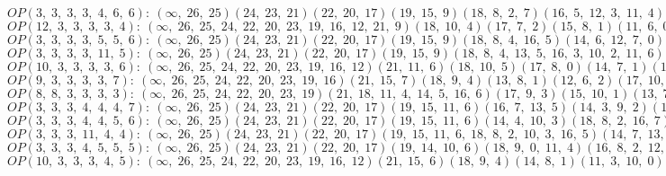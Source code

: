 $OP(3, \;3, \;3, \;3, \;4, \;6, \;6): \:(\infty, \;26, \;25)(24, \;23, \;21)(22, \;20, \;17)(19, \;15, \;9)(18, \;8, \;2, \;7)(16, \;5, \;12, \;3, \;11, \;4)(14, \;6, \;10, \;1, \;13, \;0)$\\
$OP(12, \;3, \;3, \;3, \;3, \;4): \:(\infty, \;26, \;25, \;24, \;22, \;20, \;23, \;19, \;16, \;12, \;21, \;9)(18, \;10, \;4)(17, \;7, \;2)(15, \;8, \;1)(11, \;6, \;0)(14, \;5, \;13, \;3)$\\
$OP(3, \;3, \;3, \;3, \;5, \;5, \;6): \:(\infty, \;26, \;25)(24, \;23, \;21)(22, \;20, \;17)(19, \;15, \;9)(18, \;8, \;4, \;16, \;5)(14, \;6, \;12, \;7, \;0)(13, \;2, \;11, \;3, \;10, \;1)$\\
$OP(3, \;3, \;3, \;3, \;11, \;5): \:(\infty, \;26, \;25)(24, \;23, \;21)(22, \;20, \;17)(19, \;15, \;9)(18, \;8, \;4, \;13, \;5, \;16, \;3, \;10, \;2, \;11, \;6)(14, \;7, \;1, \;12, \;0)$\\
$OP(10, \;3, \;3, \;3, \;3, \;6): \:(\infty, \;26, \;25, \;24, \;22, \;20, \;23, \;19, \;16, \;12)(21, \;11, \;6)(18, \;10, \;5)(17, \;8, \;0)(14, \;7, \;1)(15, \;4, \;13, \;2, \;9, \;3)$\\
$OP(9, \;3, \;3, \;3, \;3, \;7): \:(\infty, \;26, \;25, \;24, \;22, \;20, \;23, \;19, \;16)(21, \;15, \;7)(18, \;9, \;4)(13, \;8, \;1)(12, \;6, \;2)(17, \;10, \;0, \;11, \;3, \;14, \;5)$\\
$OP(8, \;8, \;3, \;3, \;3, \;3): \:(\infty, \;26, \;25, \;24, \;22, \;20, \;23, \;19)(21, \;18, \;11, \;4, \;14, \;5, \;16, \;6)(17, \;9, \;3)(15, \;10, \;1)(13, \;7, \;2)(12, \;8, \;0)$\\
$OP(3, \;3, \;3, \;4, \;4, \;4, \;7): \:(\infty, \;26, \;25)(24, \;23, \;21)(22, \;20, \;17)(19, \;15, \;11, \;6)(16, \;7, \;13, \;5)(14, \;3, \;9, \;2)(18, \;8, \;1, \;10, \;0, \;12, \;4)$\\
$OP(3, \;3, \;3, \;4, \;4, \;5, \;6): \:(\infty, \;26, \;25)(24, \;23, \;21)(22, \;20, \;17)(19, \;15, \;11, \;6)(14, \;4, \;10, \;3)(18, \;8, \;2, \;16, \;7)(13, \;5, \;12, \;0, \;9, \;1)$\\
$OP(3, \;3, \;3, \;11, \;4, \;4): \:(\infty, \;26, \;25)(24, \;23, \;21)(22, \;20, \;17)(19, \;15, \;11, \;6, \;18, \;8, \;2, \;10, \;3, \;16, \;5)(14, \;7, \;13, \;4)(12, \;1, \;9, \;0)$\\
$OP(3, \;3, \;3, \;4, \;5, \;5, \;5): \:(\infty, \;26, \;25)(24, \;23, \;21)(22, \;20, \;17)(19, \;14, \;10, \;6)(18, \;9, \;0, \;11, \;4)(16, \;8, \;2, \;12, \;5)(15, \;7, \;1, \;13, \;3)$\\
$OP(10, \;3, \;3, \;3, \;4, \;5): \:(\infty, \;26, \;25, \;24, \;22, \;20, \;23, \;19, \;16, \;12)(21, \;15, \;6)(18, \;9, \;4)(14, \;8, \;1)(11, \;3, \;10, \;0)(17, \;7, \;2, \;13, \;5)$\\
